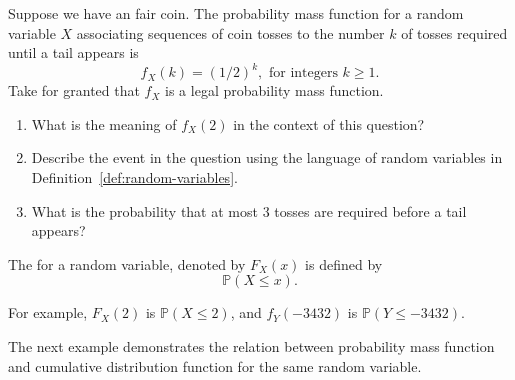 \documentclass[../main.tex]{subfiles}
\begin{document}
\begin{example}
  Suppose we have an fair coin. The probability mass function for a random variable \(X\) associating sequences of coin tosses to the number \(k\) of tosses required until a tail appears is
  \[
    f_{X}(k) = (1/2)^{k},  \text{ for integers } k \ge 1.
  \]
  Take for granted that \(f_{X}\) is a legal probability mass function. 


  \begin{enumerate}[wide]
    \item What is the meaning of \(f_{X}(2)\) in the context of this question?
    \item Describe the event in the question using the language of random variables in Definition~\ref{def:random-variables}. 
    \item What is the probability that at most \(3\) tosses are required before a tail appears?
  \end{enumerate}
\end{example}

\clearpage

\begin{definition} \label{def:discrete-cdf}
  The  for a random variable, denoted by \(F_{X}(x)\) is defined by 
  \[
    \mathbb{P}(X \le x).
  \]

  For example, \(F_{X}(2)\) is \(\mathbb{P}(X \le 2)\), and \(f_{Y}(-3432)\) is \(\mathbb{P}(Y \le -3432)\).
\end{definition}

The next example demonstrates the relation between probability mass function and cumulative distribution function for the same random variable. 
\end{document}
